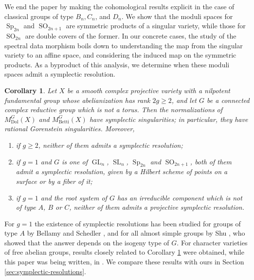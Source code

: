 \documentclass[11pt, a4paper]{amsart}
\newtheorem{corollary}[theorem]{Corollary}
\theoremstyle{definition}
\theoremstyle{myitemstyle}
\DeclareMathOperator{\GL}{GL}
\DeclareMathOperator{\Sp}{Sp}
\DeclareMathOperator{\SO}{SO}
\DeclareMathOperator{\SL}{SL}
\newcommand{\Dol}{{\mathrm{Dol}}}
\newcommand{\Betti}{{\mathrm{Betti}}}
\begin{document}
We end the paper by making the cohomological results explicit in the case of classical groups of type $B_n,C_n$, and $D_n$. We show that the moduli spaces for $\Sp_{2n}$ and $\SO_{2n+1}$ are symmetric products of a singular variety, while  those  for $\SO_{2n}$ are double covers of the former. 
In our concrete cases, the study of the spectral data morphism boils down to understanding the map from the singular variety to an affine space, and  considering the induced map on the symmetric products. As a byproduct of this analysis, we determine when these moduli spaces admit a symplectic resolution. 

\begin{corollary}
	\label{cor:intro symplectic}
	Let $X$ be a smooth complex projective variety with a nilpotent fundamental group whose abelianization has rank $2g\geq2$, and let $G$ be a connected complex reductive group which is not a torus. Then the normalizations of $M^G_\Dol(X)$ and $M^G_\Betti(X)$ have symplectic singularities; in particular, they have rational Gorenstein singularities. Moreover,
	\begin{enumerate}
		\item if $g\geq2$, neither of them admits a symplectic resolution;
		\item if $g=1$ and $G$ is one of $\GL_n$, $\SL_n$, $\Sp_{2n}$ and $\SO_{2n+1}$, both of them admit a symplectic resolution, given by a Hilbert scheme of points on a surface or by a fiber of it;
		\item if $g=1$ and the root system of $G$ has an irreducible component which is not of type $A$, $B$ or $C$, neither of them admits a projective symplectic resolution.
	\end{enumerate}
\end{corollary}

For $g=1$ the existence of symplectic resolutions has been studied for groups of type $A$ by Bellamy and Schedler \cite{BellamySchedler23}, and for all almost simple groups by Shu \cite{Shu24}, who showed that the answer depends on the isogeny type of $G$. For character varieties of free abelian groups, results closely related to Corollary \ref{cor:intro symplectic} were obtained, while this paper was being written, in \cite{FGPZ26}. We compare these results with ours in Section \ref{sec:symplectic-resolutions}.
\end{document}
